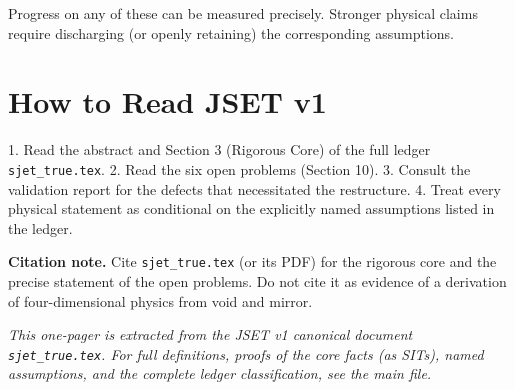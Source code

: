\documentclass[11pt]{article}
\begin{document}
Progress on any of these can be measured precisely. Stronger physical claims require discharging (or openly retaining) the corresponding assumptions.

\section*{How to Read JSET v1}

1. Read the abstract and Section 3 (Rigorous Core) of the full ledger \texttt{sjet\_true.tex}.
2. Read the six open problems (Section 10).
3. Consult the validation report for the defects that necessitated the restructure.
4. Treat every physical statement as conditional on the explicitly named assumptions listed in the ledger.

\textbf{Citation note.} Cite \texttt{sjet\_true.tex} (or its PDF) for the rigorous core and the precise statement of the open problems. Do not cite it as evidence of a derivation of four-dimensional physics from void and mirror.

\vspace{0.5em}
\noindent\textit{This one-pager is extracted from the JSET v1 canonical document \texttt{sjet\_true.tex}. For full definitions, proofs of the core facts (as SITs), named assumptions, and the complete ledger classification, see the main file.}
\end{document}
